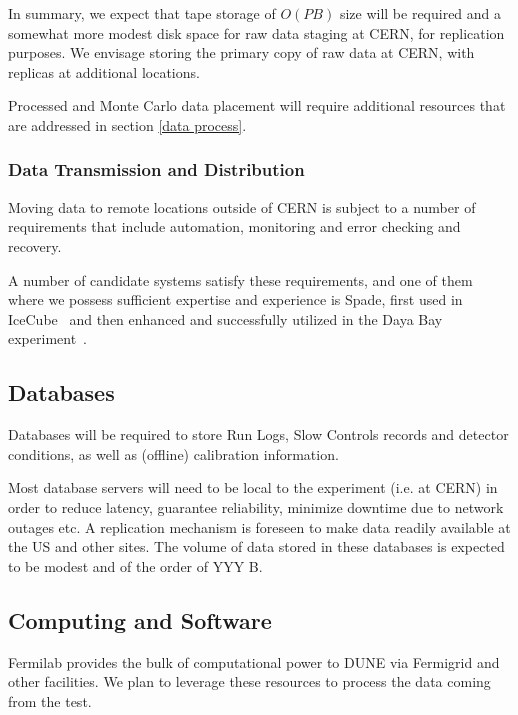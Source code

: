 In summary, we expect that tape storage of $O(PB)$ size will be required
and a somewhat more modest disk space for raw data staging at CERN, for replication purposes. 
We envisage storing the primary copy of raw data at CERN, with replicas at additional locations. 

Processed and Monte Carlo data placement will require additional resources that are addressed in section \ref{data process}.


\subsubsection{Data Transmission and Distribution}
Moving data to remote locations outside of CERN is subject to a number of requirements that include
automation, monitoring and error checking and recovery. 

A number of candidate systems satisfy these requirements, and one of them where we possess sufficient expertise and experience 
is Spade, first used in IceCube~\cite{spade_icecube} and then enhanced and successfully utilized in the Daya Bay experiment~\cite{spade_dayabay}.


\subsection{Databases}
Databases will be required to store Run Logs, Slow Controls records and detector conditions, as well as (offline) calibration information.

Most database servers will need to be local to the experiment (i.e. at CERN) in order to reduce latency, guarantee reliability, minimize
downtime due to network outages etc. A replication mechanism is foreseen to make data readily available at the US and other sites.
The volume of data stored in these databases is expected to be modest and of the order of YYY B.

\subsection{Computing and Software}


Fermilab provides the bulk of computational power to DUNE via Fermigrid and other facilities. 
We plan to leverage these resources to process the data coming from the test.

